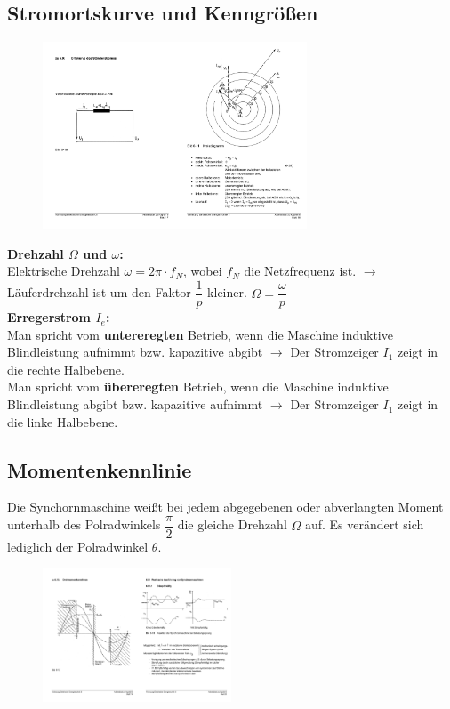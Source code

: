 \documentclass[11pt]{article}
\begin{document}
\subsection*{Stromortskurve und Kenngrößen}
\begin{figure}[H]
	\centering
	\includegraphics[width=0.7\textwidth]{img/SM_Ortskurve.pdf}
\end{figure}

\textbf{Drehzahl $\Omega$ und $\omega$:}\\
Elektrische Drehzahl $\omega = 2\pi\cdot f_N$, wobei $f_N$ die Netzfrequenz ist. $\rightarrow$ Läuferdrehzahl ist um den Faktor $\dfrac{1}{p}$ kleiner. $\Omega=\dfrac{\omega}{p}$\\

\textbf{Erregerstrom $I_e$:} \\ 
Man spricht vom \textbf{untereregten} Betrieb, wenn die Maschine induktive Blindleistung aufnimmt bzw. kapazitive abgibt $\rightarrow$ Der Stromzeiger $I_1$ zeigt in die rechte Halbebene.\\
Man spricht vom \textbf{übereregten} Betrieb, wenn die Maschine induktive Blindleistung abgibt bzw. kapazitive aufnimmt $\rightarrow$ Der Stromzeiger $I_1$ zeigt in die linke Halbebene.\\

\subsection*{Momentenkennlinie}
Die Synchornmaschine weißt bei jedem abgegebenen oder abverlangten Moment unterhalb des Polradwinkels $\dfrac{\pi}{2}$ die gleiche Drehzahl $\Omega$ auf. Es verändert sich lediglich der Polradwinkel $\theta$.

\begin{figure}[H]
	\centering
	\includegraphics[width=0.5\textwidth]{img/SM_Kennlinie.pdf}
\end{figure}
\end{document}
